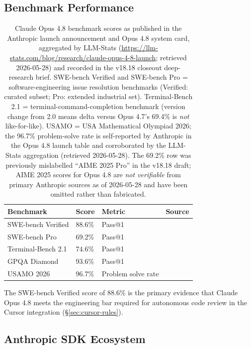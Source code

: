 \subsection{Benchmark Performance}
\label{ssec:opus-benchmarks}

\begin{table}[ht]
\centering
\begin{tabular}{llll}
\textbf{Benchmark} & \textbf{Score} & \textbf{Metric} & \textbf{Source} \\
\hline
SWE-bench Verified & 88.6\% & Pass@1 & \cite{llmstats_opus48,cursor_claude_opus_deep} \\
SWE-bench Pro & 69.2\% & Pass@1 & \cite{llmstats_opus48,cursor_claude_opus_deep} \\
Terminal-Bench 2.1 & 74.6\% & Pass@1 & \cite{llmstats_opus48,cursor_claude_opus_deep} \\
GPQA Diamond & 93.6\% & Pass@1 & \cite{llmstats_opus48} \\
USAMO 2026 & 96.7\% & Problem solve rate & \cite{llmstats_opus48,cursor_claude_opus_deep} \\
\end{tabular}
\caption{Claude Opus 4.8 benchmark scores as published in the Anthropic
  launch announcement and Opus 4.8 system card, aggregated by LLM-Stats
  (\url{https://llm-stats.com/blog/research/claude-opus-4-8-launch};
  retrieved 2026-05-28) and recorded in the v18.18 closeout deep-research
  brief.  SWE-bench Verified and SWE-bench Pro = software-engineering issue
  resolution benchmarks (Verified: curated subset; Pro: extended industrial
  set).  Terminal-Bench 2.1 = terminal-command-completion benchmark (version
  change from 2.0 means delta versus Opus 4.7's 69.4\% is \emph{not}
  like-for-like).  USAMO = USA Mathematical Olympiad 2026; the 96.7\%
  problem-solve rate is self-reported by Anthropic in the Opus 4.8 launch
  table and corroborated by the LLM-Stats aggregation
  (retrieved 2026-05-28).  The 69.2\% row was previously mislabelled
  ``AIME 2025 Pro'' in the v18.18 draft; AIME 2025 scores for Opus 4.8 are
  \emph{not verifiable} from primary Anthropic sources as of 2026-05-28 and
  have been omitted rather than fabricated.}
\label{tab:opus-benchmarks}
\end{table}

The SWE-bench Verified score of 88.6\% is the primary evidence that Claude
Opus 4.8 meets the engineering bar required for autonomous code review in
the Cursor integration (\S\ref{sec:cursor-rules}).

\subsection{Anthropic SDK Ecosystem}
\label{ssec:anthropic-sdk}

